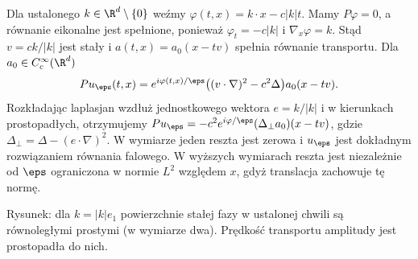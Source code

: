 \begin{przyklad}
\label{ex:pde31-plane-phase}
Dla ustalonego $k\in\R^d\setminus\{0\}$
weźmy $\varphi(t,x)=k\cdot x-c|k|t$.
Mamy $P\varphi=0$, a równanie eikonalne
jest spełnione, ponieważ $\varphi_t=-c|k|$
i $\nabla_x\varphi=k$.
Stąd $v=ck/|k|$ jest stały i
$a(t,x)=a_0(x-tv)$ spełnia równanie transportu.
Dla $a_0\in C_c^\infty(\R^d)$
\[
 Pu_\eps(t,x)=
 e^{i\varphi(t,x)/\eps}
 \bigl((v\cdot\nabla)^2-c^2\Delta\bigr)a_0(x-tv).
\]
Rozkładając laplasjan wzdłuż jednostkowego
wektora $e=k/|k|$ i w kierunkach prostopadłych,
otrzymujemy $Pu_\eps=-c^2e^{i\varphi/\eps}
(\Delta_\perp a_0)(x-tv)$, gdzie
$\Delta_\perp=\Delta-(e\cdot\nabla)^2$.
W wymiarze jeden reszta jest zerowa i
$u_\eps$ jest dokładnym rozwiązaniem
równania falowego. W wyższych wymiarach
reszta jest niezależnie od $\eps$ ograniczona
w normie $L^2$ względem $x$, gdyż translacja
zachowuje tę normę.
\end{przyklad}

\begin{center}

{\small Rysunek: dla $k=|k|e_1$ powierzchnie stałej
fazy w ustalonej chwili są równoległymi prostymi
(w wymiarze dwa). Prędkość transportu amplitudy
jest prostopadła do nich.}
\end{center}

